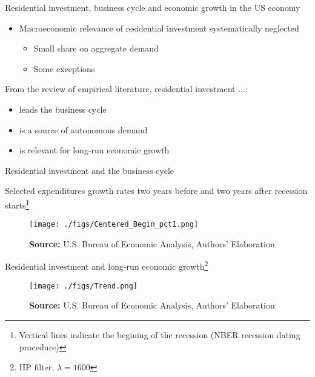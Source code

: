 \documentclass[10pt]{beamer}
\begin{document}
\begin{frame}[label={sec:org1151b63}]{Residential investment, business cycle and economic growth in the US economy}
\begin{itemize}
\item Macroeconomic relevance of residential investment systematically neglected
\begin{itemize}
\item Small share on aggregate demand
\item Some exceptions \citep{duesenberry_investment_1958,keynes_collected_1978}
\end{itemize}
\end{itemize}

From the review of empirical literature, residential investment \(\ldots\):

\begin{itemize}
\item leads the business cycle \citep{green_follow_1997,leamer_housing_2007,leamer_housing_2015,kydland_2016_housing}
\item is a source of autonomous demand \citep{fiebiger_semi-autonomous_2018,teixeira_crescimento_2015,fiebiger_trend_2017}
\item is relevant for long-run economic growth \citep{perez_Montiel_2021,girardi_autonomous_2018}
\end{itemize}
\end{frame}



\begin{frame}[label={sec:org8f0b6fe}]{Residential investment and the business cycle}
\begin{block}{Selected expenditures growth rates two years before and two years after recession starts\footnote{\tiny{Vertical lines indicate the begining of the recession (NBER recession dating procedure)}}}
\begin{figure}[H]
	\centering
	\texttt{[image: ./figs/Centered\_Begin\_pct1.png]}
	\caption*{\scriptsize{\textbf{Source:} U.S. Bureau of Economic Analysis, Authors' Elaboration}}
\end{figure}
\end{block}
\end{frame}




\begin{frame}[label={sec:orgb6692ea}]{Residential investment and long-run economic growth\footnote{\tiny{HP filter, $\lambda = 1600$}}}
\begin{figure}[H]
	\centering
	\texttt{[image: ./figs/Trend.png]}
	\caption*{\scriptsize{\textbf{Source:} U.S. Bureau of Economic Analysis, Authors' Elaboration}}
\end{figure}
\end{frame}
\end{document}
